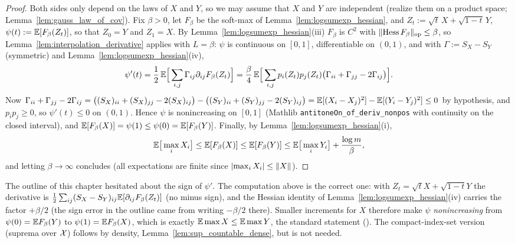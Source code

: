 \begin{proof}
\leanok
{}
Both sides only depend on the laws of $X$ and $Y$, so we may assume that $X$ and $Y$ are
independent (realize them on a product space; Lemma~\ref{lem:gauss_law_of_cov}). Fix
$\beta > 0$, let $F_\beta$ be the soft-max of Lemma~\ref{lem:logsumexp_hessian}, and
$Z_t := \sqrt t\,X + \sqrt{1-t}\,Y$, $\psi(t) := \mathbb{E}[F_\beta(Z_t)]$, so that $Z_0 = Y$ and
$Z_1 = X$. By Lemma~\ref{lem:logsumexp_hessian}(iii) $F_\beta$ is $C^2$ with
$\lVert \mathrm{Hess}\,F_\beta \rVert_{\mathrm{op}}\le\beta$, so Lemma~\ref{lem:interpolation_derivative}
applies with $L = \beta$: $\psi$ is continuous on
$[0,1]$, differentiable on $(0,1)$, and with $\Gamma := S_X - S_Y$ (symmetric) and
Lemma~\ref{lem:logsumexp_hessian}(iv),
\[
  \psi'(t) = \frac12\,\mathbb{E}\Big[\sum_{i,j}\Gamma_{ij}\partial_{ij}F_\beta(Z_t)\Big]
  = \frac{\beta}{4}\,\mathbb{E}\Big[\sum_{i,j}p_i(Z_t)p_j(Z_t)\big(\Gamma_{ii}+\Gamma_{jj}-2\Gamma_{ij}\big)\Big].
\]
Now $\Gamma_{ii}+\Gamma_{jj}-2\Gamma_{ij} = \big((S_X)_{ii}+(S_X)_{jj}-2(S_X)_{ij}\big) - \big((S_Y)_{ii}+(S_Y)_{jj}-2(S_Y)_{ij}\big)
= \mathbb{E}[(X_i-X_j)^2] - \mathbb{E}[(Y_i-Y_j)^2] \le 0$ by hypothesis, and $p_ip_j \ge 0$, so $\psi'(t)\le 0$
on $(0,1)$. Hence $\psi$ is nonincreasing on $[0,1]$ (Mathlib
\texttt{antitoneOn\_of\_deriv\_nonpos} with continuity on the closed interval), and
$\mathbb{E}[F_\beta(X)] = \psi(1) \le \psi(0) = \mathbb{E}[F_\beta(Y)]$. Finally, by
Lemma~\ref{lem:logsumexp_hessian}(i),
\[
  \mathbb{E}\big[\max_iX_i\big] \le \mathbb{E}[F_\beta(X)] \le \mathbb{E}[F_\beta(Y)] \le \mathbb{E}\big[\max_iY_i\big] + \frac{\log m}{\beta},
\]
and letting $\beta\to\infty$ concludes (all expectations are finite since $\lvert \max_iX_i \rvert\le\lVert X \rVert$).
\end{proof}

\begin{remark}\label{rem:psf_sign}
The outline of this chapter hesitated about the sign of $\psi'$. The computation above is the
correct one: with $Z_t = \sqrt t X + \sqrt{1-t}Y$ the derivative is
$\frac12\sum_{ij}(S_X-S_Y)_{ij}\mathbb{E}[\partial_{ij}F_\beta(Z_t)]$ (no minus sign), and the Hessian
identity of Lemma~\ref{lem:logsumexp_hessian}(iv) carries the factor $+\beta/2$ (the sign error in
the outline came from writing $-\beta/2$ there). Smaller increments for $X$ therefore make
$\psi$ \emph{nonincreasing} from $\psi(0) = \mathbb{E} F_\beta(Y)$ to $\psi(1) = \mathbb{E} F_\beta(X)$, which is
exactly $\mathbb{E}\max X\le\mathbb{E}\max Y$, the standard statement (\cite[Theorem~7.2.11]{vershynin2018high}).
The compact-index-set version (suprema over $\mathcal{X}$) follows by density,
Lemma~\ref{lem:sup_countable_dense}, but is not needed.
\end{remark}

